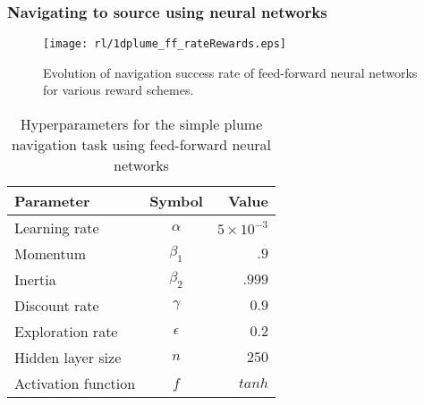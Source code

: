 \documentclass[../dissertation.tex]{subfiles}
\begin{document}
\subsubsection{Navigating to source using neural networks}

\begin{figure}[ht]
    \centering
    \texttt{[image: rl/1dplume\_ff\_rateRewards.eps]}
    \caption{Evolution of navigation success rate of feed-forward neural networks for various reward schemes.}
    \label{fig:1dplumeRewSchFF}
\end{figure}

\begin{table}
    \centering
    \begin{tabular}{lcr}
        \toprule
        Parameter           & Symbol        & Value                 \\
        \midrule
        Learning rate       & $\alpha$      & $5 \times 10^{-3}$    \\
        Momentum            & $\beta_{1}$   & $.9$                  \\
        Inertia             & $\beta_{2}$   & $.999$                \\
        Discount rate       & $\gamma$      & $0.9$                 \\
        Exploration rate    & $\epsilon$    & $0.2$                 \\
        Hidden layer size   & $n$           & $250$                 \\
        Activation function & $f$           & $tanh$                \\
        \bottomrule
    \end{tabular}
    \caption{Hyperparameters for the simple plume navigation task using feed-forward neural networks}
    \label{tab:1dFF_hyperparameters}
\end{table}
\end{document}
